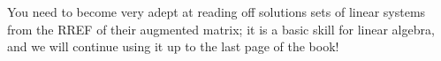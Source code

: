 You need to become very adept at reading off solutions sets of linear systems from the RREF
of their augmented matrix; it is a basic skill for linear algebra, and we will continue using it up to the last page of the book! 







%
